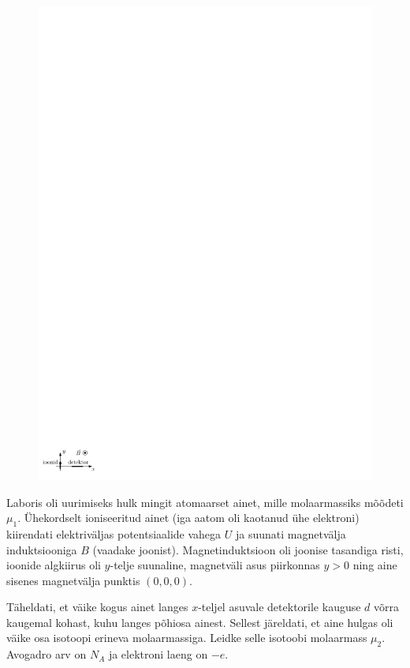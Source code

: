 
\begin{figure}%
\includegraphics[width=\linewidth]{2013-v2g-10-massspektromeeter_ipe}%
\end{figure}
Laboris oli uurimiseks hulk mingit atomaarset ainet, mille molaarmassiks mõõdeti
$\mu_{1}$. Ühekordselt ioniseeritud ainet (iga aatom oli kaotanud ühe
elektroni) kiirendati elektriväljas potentsiaalide vahega $U$ ja suunati magnetvälja
induktsiooniga $B$ (vaadake joonist). Magnetinduktsioon oli joonise tasandiga
risti, 
ioonide algkiirus oli $y$-telje suunaline,
magnetväli asus piirkonnas $y>0$ ning aine sisenes magnetvälja punktis
$(0, 0, 0)$.

Täheldati, et väike kogus ainet langes $x$-teljel asuvale
detektorile kauguse
$d$ võrra kaugemal kohast, kuhu langes põhiosa ainest. Sellest järeldati,
et aine hulgas oli väike osa isotoopi erineva molaarmassiga. Leidke
selle isotoobi molaarmass $\mu_{2}$. Avogadro arv on $N_A$ ja elektroni laeng
on $-e$.

